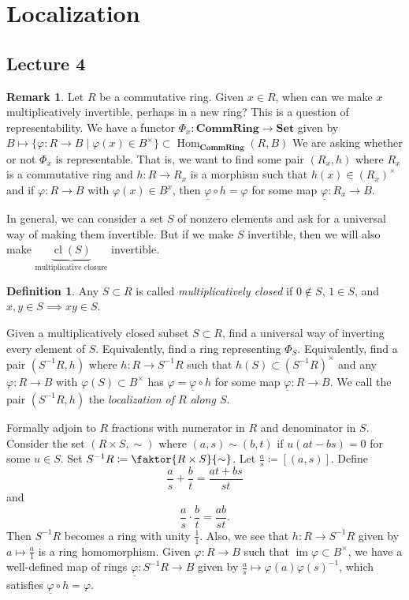 \documentclass[10pt,letterpaper,cm]{nupset}
\theoremstyle{definition}
\newtheorem*{definition}{Definition}
\newtheorem{remark}{Remark}
\newcommand{\1}{\mathbf{1}}
\newcommand{\0}{\vec 0}
\DeclareMathOperator{\im}{im}
\DeclareMathOperator{\cl}{cl}
\DeclareMathOperator{\Hom}{Hom}
\begin{document}
\section{Localization}

\subsection{Lecture 4}

\begin{remark}
Let $R$ be a commutative ring. Given $x\in R$, when can we make $x$ multiplicatively invertible, perhaps in a new ring? This is a question of representability. We have a functor $\Phi_x : \mathbf{CommRing} \to \mathbf{Set}$ given by $B \mapsto \{\varphi : R \to B \mid \varphi(x) \in B^{\times}\} \subset \Hom_{\mathbf{CommRing}}(R, B)$ We are asking whether or not $\Phi_x$ is representable. That is, we want to find some pair $(R_x, h)$ where $R_x$ is a commutative ring and $h: R \to R_x$ is a morphism such that $h(x) \in (R_x)^{\times}$ and if $\varphi : R \to B$ with $\varphi(x) \in B^x$, then $\underline{\varphi}  \circ h= \varphi$ for some map $\underline{\varphi} : R_x \to B$.

In general, we can consider a set $S$ of nonzero elements and ask for a universal way of making them invertible. But if we make $S$ invertible, then we will also make $\underbrace{\cl(S)}_{\text{multiplicative closure}}$ invertible.
\begin{definition}
Any $S\subset R$ is called \textit{multiplicatively closed} if $0\notin S$, $1\in S$, and $x,y\in S \implies xy\in S$.
\end{definition}
Given a multiplicatively closed subset $S \subset R$, find a universal way of inverting every element of $S$. Equivalently, find a ring representing $\Phi_S$. Equivalently, find a pair $(S^{-1}R, h)$ where  $h: R\to S^{-1}R$ such that $h(S) \subset (S^{-1}R)^{\times}$ and any $\varphi : R \to B$ with $\varphi(S) \subset B^{\times}$ has $\varphi = \underline{\varphi} \circ h$ for some map $ \underline{\varphi} : R \to B$.  We call the pair $(S^{-1}R, h)$ the \textit{localization of $R$ along $S$}.

Formally adjoin to $R$ fractions with numerator in $R$ and denominator in $S$. Consider the set $(R \times S, \sim)$ where $(a, s) \sim (b,t)$ if $u(at-bs) =0$ for some $u\in S$. Set $S^{-1}R \coloneqq  \faktor{R\times S}{\sim}$. Let $\frac{a}{s} \coloneqq  [(a,s)]$. Define $$\frac{a}{s} + \frac{b}{t} = \frac{at+bs}{st}$$ and $$\frac{a}{s}\cdot \frac{b}{t} = \frac{ab}{st}.$$ Then $S^{-1}R$ becomes a ring with unity $\frac{1}{1}$. Also, we see that $h: R \to S^{-1}R$ given by $a\mapsto \frac{a}{1}$ is a ring homomorphism. Given $\varphi: R \to B$ such that $\im{\varphi} \subset B^{\times}$, we have a well-defined map of rings $\underline{\varphi} : S^{-1}R \to B$ given by $\frac{a}{s} \mapsto \varphi(a) \varphi(s)^{-1}$, which satisfies $\underline{\varphi} \circ h = \varphi$. 
\end{remark}
\end{document}
